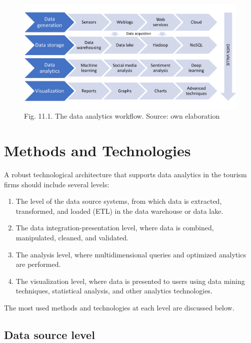 \documentclass[
  letterpaper,
  DIV=11,
  numbers=noendperiod]{scrreprt}
\begin{document}
\begin{figure}

{\centering \includegraphics{img/fig14.png}

}

\caption{Fig. 11.1. The data analytics workflow. Source: own
elaboration}

\end{figure}

\hypertarget{methods-and-technologies}{%
\section{Methods and Technologies}\label{methods-and-technologies}}

A robust technological architecture that supports data analytics in the
tourism firms should include several levels:

\begin{enumerate}
\def\labelenumi{\arabic{enumi}.}
\item
  The level of the data source systems, from which data is extracted,
  transformed, and loaded (ETL) in the data warehouse or data lake.
\item
  The data integration-presentation level, where data is combined,
  manipulated, cleaned, and validated.
\item
  The analysis level, where multidimensional queries and optimized
  analytics are performed.
\item
  The visualization level, where data is presented to users using data
  mining techniques, statistical analysis, and other analytics
  technologies.
\end{enumerate}

The most used methods and technologies at each level are discussed
below.

\hypertarget{data-source-level}{%
\subsection{Data source level}\label{data-source-level}}
\end{document}
